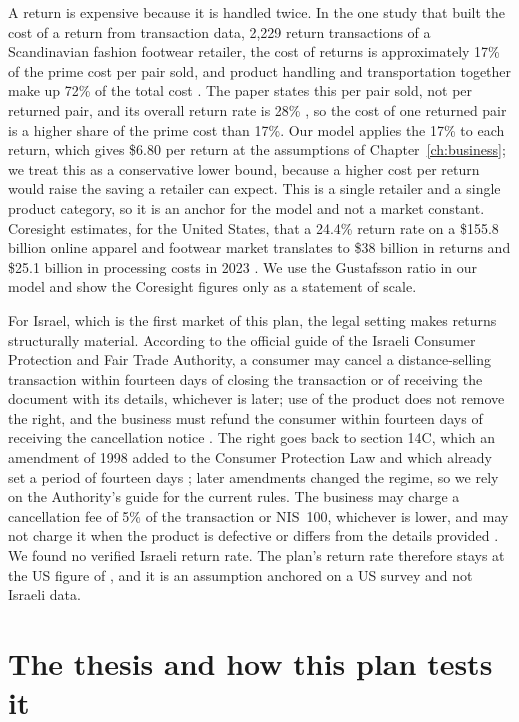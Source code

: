 A return is expensive because it is handled twice. In the one study that built the cost of a return from transaction data, 2,229 return transactions of a Scandinavian fashion footwear retailer, the cost of returns is approximately 17\% of the prime cost per pair sold, and product handling and transportation together make up 72\% of the total cost \cite{gustafsson2021}. The paper states this per pair sold, not per returned pair, and its overall return rate is 28\% \cite{gustafsson2021}, so the cost of one returned pair is a higher share of the prime cost than 17\%. Our model applies the 17\% to each return, which gives \$6.80 per return at the assumptions of Chapter~\ref{ch:business}; we treat this as a conservative lower bound, because a higher cost per return would raise the saving a retailer can expect. This is a single retailer and a single product category, so it is an anchor for the model and not a market constant. Coresight estimates, for the United States, that a 24.4\% return rate on a \$155.8 billion online apparel and footwear market translates to \$38 billion in returns and \$25.1 billion in processing costs in 2023 \cite{coresight2023}. We use the Gustafsson ratio in our model and show the Coresight figures only as a statement of scale.

For Israel, which is the first market of this plan, the legal setting makes returns structurally material. According to the official guide of the Israeli Consumer Protection and Fair Trade Authority, a consumer may cancel a distance-selling transaction within fourteen days of closing the transaction or of receiving the document with its details, whichever is later; use of the product does not remove the right, and the business must refund the consumer within fourteen days of receiving the cancellation notice \cite{il_cpfta_guide}. The right goes back to section 14C, which an amendment of 1998 added to the Consumer Protection Law and which already set a period of fourteen days \cite{il_cpl_amend7_1998}; later amendments changed the regime, so we rely on the Authority's guide for the current rules. The business may charge a cancellation fee of 5\% of the transaction or NIS~100, whichever is lower, and may not charge it when the product is defective or differs from the details provided \cite{il_cpfta_guide}. We found no verified Israeli return rate. The plan's return rate therefore stays at the US figure of , and it is an assumption anchored on a US survey and not Israeli data.

\section{The thesis and how this plan tests it}\label{sec:thesis}

